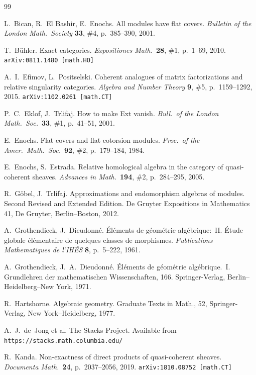 \documentclass[12pt,a4paper]{amsart}
\newcommand{\+}{\nobreakdash-}
\renewcommand{\:}{\colon}
\theoremstyle{plain}
\theoremstyle{definition}
\begin{document}
\bigskip
\begin{thebibliography}{99}
\smallskip

 L.~Bican, R.~El Bashir, E.~Enochs.
   All modules have flat covers.
\textit{Bulletin of the London Math.\ Society} \textbf{33}, \#4,
p.~385--390, 2001.

 T.~B\"uhler.
   Exact categories.
\textit{Expositiones Math.}\ \textbf{28}, \#1, p.~1--69, 2010.
\texttt{arXiv:0811.1480 [math.HO]}

 A.~I.~Efimov, L.~Positselski.
   Coherent analogues of matrix factorizations and relative
singularity categories.
\textit{Algebra and Number Theory} \textbf{9}, \#5, p.~1159--1292,
2015.  \texttt{arXiv:1102.0261 [math.CT]}

 P.~C.~Eklof, J.~Trlifaj.
   How to make Ext vanish.
\textit{Bull.\ of the London Math.\ Soc.}\ \textbf{33}, \#1,
p.~41--51, 2001.

 E.~Enochs.
   Flat covers and flat cotorsion modules.
\textit{Proc.\ of the Amer.\ Math.\ Soc.}\ \textbf{92}, \#2,
p.~179--184, 1984.

 E.~Enochs, S.~Estrada.
   Relative homological algebra in the category of quasi-coherent
sheaves.
\textit{Advances in Math.}\ \textbf{194}, \#2, p.~284--295, 2005.

 R.~G\"obel, J.~Trlifaj.
   Approximations and endomorphism algebras of modules.
Second Revised and Extended Edition.
De Gruyter Expositions in Mathematics 41,
De Gruyter, Berlin--Boston, 2012.

 A.~Grothendieck, J.~Dieudonn\'e.
   \'El\'ements de g\'eom\'etrie alg\'ebrique:~II.
\'Etude globale \'el\'ementaire de quelques classes de morphismes.
\textit{Publications Mathematiques de l'IH\'ES} \textbf{8},
p.~5--222, 1961.

 A.~Grothendieck, J.~A.~Dieudonn\'e.
   \'El\'ements de g\'eom\'etrie alg\'ebrique.~I.
Grundlehren der mathematischen Wissenschaften, 166.
Springer-Verlag, Berlin--Heidelberg--New York, 1971.

 R.~Hartshorne.
   Algebraic geometry.
Graduate Texts in Math., 52, Springer-Verlag,
New York--Heidelberg, 1977.

 A.~J.~de~Jong et al.
   The Stacks Project.
Available from \texttt{https://stacks.math.columbia.edu/}

 R.~Kanda.
   Non-exactness of direct products of quasi-coherent sheaves.
\textit{Documenta Math.}\ \textbf{24}, p.~2037--2056, 2019.
\texttt{arXiv:1810.08752 [math.CT]}


\end{thebibliography}
\end{document}
